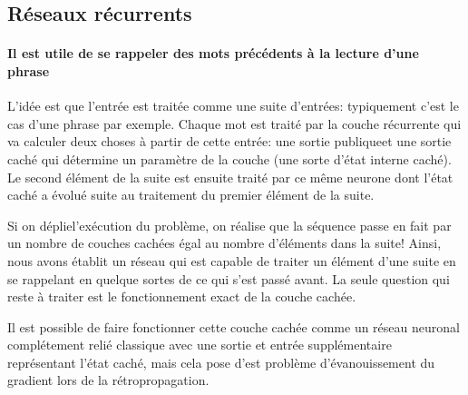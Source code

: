 \documentclass[a4paper,11pt]{article}
\begin{document}
\subsection{Réseaux récurrents}

\paragraph{Il est utile de se rappeler des mots précédents à la lecture d'une phrase}

L'idée est que l'entrée est traitée comme une suite d'entrées:
typiquement c'est le cas d'une phrase par exemple. Chaque mot est traité par la
couche récurrente qui va calculer deux choses à partir de cette entrée: une
sortie \og publique\fg et une sortie caché qui détermine un paramètre de la
couche (une sorte d'état interne caché). Le second élément de la suite est
ensuite traité par ce même neurone dont l'état caché a évolué suite au
traitement du premier élément de la suite.

Si on \og déplie\fg l'exécution du problème, on réalise que la séquence passe en
fait par un nombre de couches cachées égal au nombre d'éléments dans la suite!
Ainsi, nous avons établit un réseau qui est capable de traiter un élément d'une
suite en se rappelant en quelque sortes de ce qui s'est passé avant. La seule
question qui reste à traiter est le fonctionnement exact de la couche cachée.

Il est possible de faire fonctionner cette couche cachée comme un réseau neuronal
complétement relié classique avec une sortie et entrée supplémentaire
représentant l'état caché, mais cela pose d'est problème d'évanouissement du
gradient lors de la rétropropagation.
\end{document}
